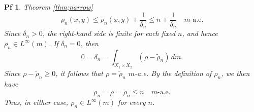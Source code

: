 \documentclass[10pt,a4paper]{amsart}
\newtheorem{pf}{Pf}
\newcommand{\dl}{\delta}
\begin{document}
\begin{pf}{Theorem \ref{thm;narrow}}
\begin{equation}\label{limsup;1}
\rho_n(x,y)\leq\tilde{\rho}_n(x,y)+\frac{1}{\dl_n}\leq n+\frac{1}{\dl_n}\quad m\text{-a.e.}
\end{equation}
Since $\dl_n>0$, the right-hand side is finite for each fixed $n$, and hence $\rho_n\in L^\infty(m)$. If $\dl_n=0$, then
\begin{equation*}
0=\dl_n=\int_{X_1\times X_2}(\rho-\tilde{\rho}_n)\,dm.
\end{equation*}
Since $\rho-\tilde{\rho}_n\geq0$, it follows that $\rho=\tilde{\rho}_n$ $m$-a.e. By the definition of $\rho_n$, we then have
\begin{equation*}
\rho_n=\rho=\tilde{\rho}_n\leq n\quad m\text{-a.e.}
\end{equation*}
Thus, in either case, $\rho_n\in L^\infty(m)$ for every $n$.


\end{pf}
\end{document}
